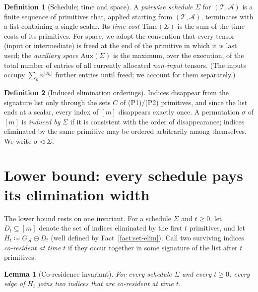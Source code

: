 \documentclass[11pt]{article}
\newcommand{\calA}{\mathcal{A}}
\newcommand{\calT}{\mathcal{T}}
\newcommand{\graphform}[1]{G_{#1}}
\newcommand{\Time}{\mathrm{Time}}
\newcommand{\Aux}{\mathrm{Aux}}
\theoremstyle{plain}
\newtheorem{lemma}{Lemma}
\theoremstyle{definition}
\newtheorem{definition}{Definition}
\theoremstyle{remark}
\begin{document}
\begin{definition}[Schedule; time and space]
\label{def:schedule}
A \emph{pairwise schedule} $\Sigma$ for $(\calT,\calA)$ is a finite
sequence of primitives that, applied starting from $(\calT,\calA)$,
terminates with a list containing a single scalar.  Its \emph{time cost}
$\Time(\Sigma)$ is the sum of the time costs of its primitives.  For
space, we adopt the convention that every tensor (input or intermediate)
is freed at the end of the primitive in which it is last used; the
\emph{auxiliary space} $\Aux(\Sigma)$ is the maximum, over the execution,
of the total number of entries of all currently allocated
\emph{non-input} tensors.  (The inputs occupy $\sum_k n^{|A_k|}$ further
entries until freed; we account for them separately.)
\end{definition}

\begin{definition}[Induced elimination orderings]
\label{def:induced}
Indices disappear from the signature list only through the sets $C$ of
(P1)/(P2) primitives, and since the list ends at a scalar, every index of
$[m]$ disappears exactly once.  A permutation $\sigma$ of $[m]$ is
\emph{induced by} $\Sigma$ if it is consistent with the order of
disappearance; indices eliminated by the same primitive may be ordered
arbitrarily among themselves.  We write $\sigma \vartriangleleft \Sigma$.
\end{definition}

\section{Lower bound: every schedule pays its elimination width}
\label{sec:lower}

The lower bound rests on one invariant.  For a schedule $\Sigma$ and
$t \ge 0$, let $D_t \subseteq [m]$ denote the set of indices eliminated by
the first $t$ primitives, and let
$H_t \coloneqq \graphform{\calA} \ominus D_t$
(well defined by Fact~\ref{fact:set-elim}).  Call two surviving indices
\emph{co-resident at time $t$} if they occur together in some signature of
the list after $t$ primitives.

\begin{lemma}[Co-residence invariant]
\label{lem:invariant}
For every schedule $\Sigma$ and every $t \ge 0$: every edge of $H_t$ joins
two indices that are co-resident at time $t$.
\end{lemma}
\end{document}

